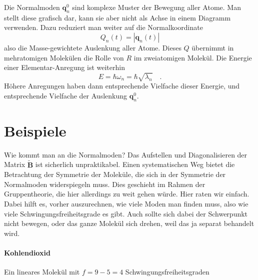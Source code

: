 Die Normalmoden $\mathbf{q}_n^0$ sind komplexe Muster der Bewegung aller Atome. Man stellt diese grafisch dar, kann sie aber nicht als Achse in einem Diagramm verwenden. Dazu reduziert man weiter auf die Normalkoordinate
\begin{equation}
Q_n(t) = | \mathbf{q}_n (t) |
\end{equation}
also die Masse-gewichtete Auslenkung aller Atome. Dieses $Q$ übernimmt in mehratomigen Molekülen die Rolle von $R$ im zweiatomigen Molekül. Die Energie einer Elementar-Anregung ist weiterhin 
\begin{equation}
E = \hbar \omega_n = \hbar	\sqrt{\lambda_n} \quad .
\end{equation}
Höhere Anregungen haben dann entsprechende Vielfache dieser Energie, und entsprechende Vielfache der Auslenkung 
 $\mathbf{q}_n^0$.


\section{Beispiele}

Wie kommt man an die Normalmoden? Das Aufstellen und Diagonalisieren der Matrix  $\tilde{\mathbf{B}} $ ist sicherlich unpraktikabel. Einen systematischen Weg bietet die Betrachtung der Symmetrie der Moleküle, die sich in der Symmetrie der Normalmoden widerspiegeln muss. Dies geschieht im Rahmen der Gruppentheorie, die hier allerdings zu weit gehen würde. Hier raten wir einfach. Dabei hilft es, vorher auszurechnen, wie viele Moden man finden muss, also wie viele Schwingungsfreiheitsgrade es gibt. Auch sollte sich dabei der Schwerpunkt nicht bewegen, oder das ganze Molekül sich drehen, weil das ja separat behandelt wird.

\paragraph{Kohlendioxid} 
Ein lineares Molekül mit $f=9 - 5 = 4$ Schwingungsfreiheitsgraden


